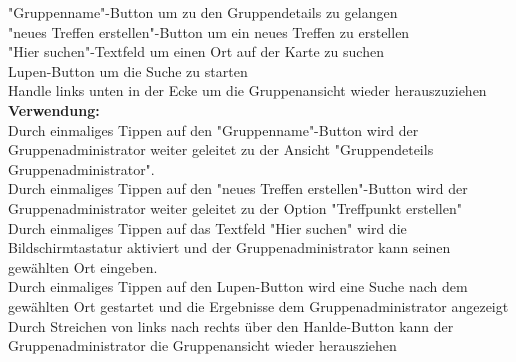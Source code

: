 "Gruppenname"-Button um zu den Gruppendetails zu gelangen\\
"neues Treffen erstellen"-Button um ein neues Treffen zu erstellen\\
"Hier suchen"-Textfeld um einen Ort auf der Karte zu suchen\\
Lupen-Button um die Suche zu starten\\
Handle links unten in der Ecke um die Gruppenansicht wieder herauszuziehen\\
\textbf{Verwendung:}\\
Durch einmaliges Tippen auf den "Gruppenname"-Button wird der Gruppenadministrator weiter geleitet zu der Ansicht "Gruppendeteils Gruppenadministrator".\\
Durch einmaliges Tippen auf den "neues Treffen erstellen"-Button wird der Gruppenadministrator weiter geleitet zu der Option "Treffpunkt erstellen"\\
Durch einmaliges Tippen auf das Textfeld "Hier suchen" wird die Bildschirmtastatur aktiviert und der Gruppenadministrator kann seinen gewählten Ort eingeben.\\
Durch einmaliges Tippen auf den Lupen-Button wird eine Suche nach dem gewählten Ort gestartet und die Ergebnisse dem Gruppenadministrator angezeigt\\
Durch Streichen von links nach rechts über den Hanlde-Button kann der Gruppenadministrator die Gruppenansicht wieder herausziehen\\ \\

